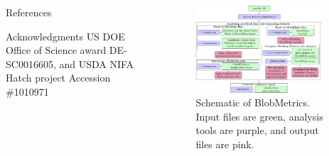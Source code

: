 \documentclass[final]{beamer}
\newlength{\sepwid}
\newlength{\onecolwid}
\newlength{\twocolwid}
\begin{document}
\begin{frame}[t]
\begin{columns}[t]
\begin{column}{\onecolwid}
\begin{block}{References}
\nocite{*} %
\small{
\vspace{0.75in}}
\end{block}
\begin{block}{Acknowledgments}
\small{US DOE Office of Science award DE-SC0016605, and USDA NIFA Hatch project Accession \#1010971}
\end{block}


\end{column} %

\begin{column}{\sepwid}\end{column} %

\begin{column}{\twocolwid}
\begin{figure}
    \centering
    \includegraphics[width=0.9\textwidth]{Framework_figure.pdf}
    \caption{Schematic of BlobMetrics. Input files are green, analysis tools are purple, and output files are pink. }
    \label{fig:Blobfig}
\end{figure}


\end{column}
\end{columns}
\end{frame}
\end{document}
